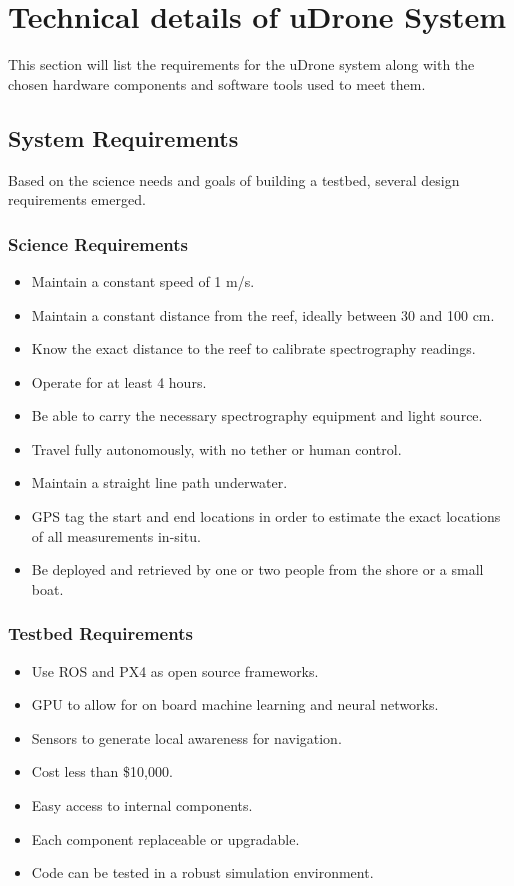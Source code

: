 \chapter{Technical details of uDrone System} \label{system}
This section will list the requirements for the uDrone system along with the chosen hardware components and software tools used to meet them.
\section{System Requirements}
Based on the science needs and goals of building a testbed, several design requirements emerged.
\subsection{Science Requirements}
\begin{itemize}
    \item Maintain a constant speed of 1 m/s.
    \item Maintain a constant distance from the reef, ideally between 30 and 100 cm.
    \item Know the exact distance to the reef to calibrate spectrography readings.
    \item Operate for at least 4 hours.
    \item Be able to carry the necessary spectrography equipment and light source.
    \item Travel fully autonomously, with no tether or human control.
    \item Maintain a straight line path underwater.
    \item GPS tag the start and end locations in order to estimate the exact locations of all measurements in-situ.
    \item Be deployed and retrieved by one or two people from the shore or a small boat. 
\end{itemize}

\subsection{Testbed Requirements}
\begin{itemize}
    \item Use ROS and PX4 as open source frameworks.
    \item GPU to allow for on board machine learning and neural networks.
    \item Sensors to generate local awareness for navigation.
    \item Cost less than \$10,000.
    \item Easy access to internal components.
    \item Each component replaceable or upgradable.
    \item Code can be tested in a robust simulation environment.
\end{itemize}


